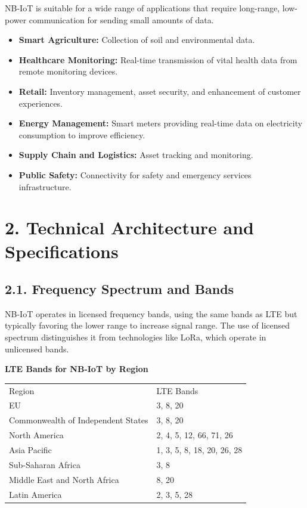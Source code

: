 \documentclass[a4paper, 12pt]{book} %
\begin{document}
NB-IoT is suitable for a wide range of applications that require
long-range, low-power communication for sending small amounts of data.

\begin{itemize}
\tightlist
\item
  \textbf{Smart Agriculture:} Collection of soil and environmental data.
\item
  \textbf{Healthcare Monitoring:} Real-time transmission of vital health
  data from remote monitoring devices.
\item
  \textbf{Retail:} Inventory management, asset security, and enhancement
  of customer experiences.
\item
  \textbf{Energy Management:} Smart meters providing real-time data on
  electricity consumption to improve efficiency.
\item
  \textbf{Supply Chain and Logistics:} Asset tracking and monitoring.
\item
  \textbf{Public Safety:} Connectivity for safety and emergency services
  infrastructure.
\end{itemize}

\section{2. Technical Architecture and
Specifications}\label{technical-architecture-and-specifications}

\subsection{2.1. Frequency Spectrum and
Bands}\label{frequency-spectrum-and-bands}

NB-IoT operates in licensed frequency bands, using the same bands as LTE
but typically favoring the lower range to increase signal range. The use
of licensed spectrum distinguishes it from technologies like LoRa, which
operate in unlicensed bands.

\textbf{LTE Bands for NB-IoT by Region}

\begin{longtable}[]{@{}ll@{}}
\toprule\noalign{}
\endhead
\bottomrule\noalign{}
\endlastfoot
Region & LTE Bands \\
EU & 3, 8, 20 \\
Commonwealth of Independent States & 3, 8, 20 \\
North America & 2, 4, 5, 12, 66, 71, 26 \\
Asia Pacific & 1, 3, 5, 8, 18, 20, 26, 28 \\
Sub-Saharan Africa & 3, 8 \\
Middle East and North Africa & 8, 20 \\
Latin America & 2, 3, 5, 28 \\
\end{longtable}
\end{document}
